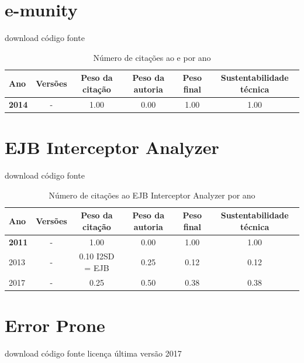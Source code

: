 \section{e-munity}
\checkmark download
\checkmark código fonte


\begin{table}[H]
\caption{Número de citações ao e por ano}
\centering
\begin{tabular}{| l | c | c | c | c | c |}
  \hline
  Ano & Versões & Peso da citação & Peso da autoria & Peso final & Sustentabilidade técnica \\
  \hline
            {\bf 2014}
          &
          -
          &
          1.00
          &
          0.00
          &
          1.00
          &
            {\color{blue} 1.00}
          \\
\hline
\end{tabular}
\end{table}



\section{EJB Interceptor Analyzer}
\checkmark download
\checkmark código fonte


\begin{table}[H]
\caption{Número de citações ao EJB Interceptor Analyzer por ano}
\centering
\begin{tabular}{| l | c | c | c | c | c |}
  \hline
  Ano & Versões & Peso da citação & Peso da autoria & Peso final & Sustentabilidade técnica \\
  \hline
            {\bf 2011}
          &
          -
          &
          1.00
          &
          0.00
          &
          1.00
          &
            {\color{blue} 1.00}
          \\
\hline
            2013
          &
          -
          &
          0.10
            {\tiny I2SD = EJB}
          &
          0.25
          &
          0.12
          &
            {\color{red} 0.12}
          \\
\hline
            2017
          &
          -
          &
          0.25
          &
          0.50
          &
          0.38
          &
            {\color{red} 0.38}
          \\
\hline
\end{tabular}
\end{table}



\section{Error Prone}
\checkmark download
\checkmark código fonte
\checkmark licença
\checkmark última versão 2017


